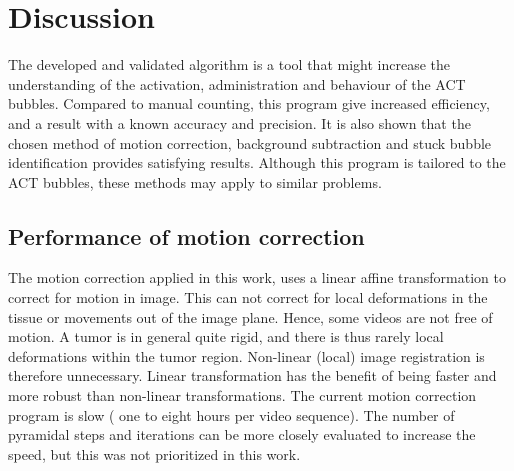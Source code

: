 \section{Discussion}
The developed and validated algorithm is a tool that might increase the understanding of the activation, administration and behaviour of the ACT\texttrademark{} bubbles. Compared to manual counting, this program give increased efficiency, and a result with a known accuracy and precision. It is also shown that the chosen method of motion correction, background subtraction and stuck bubble identification provides satisfying results. Although this program is tailored to the ACT\texttrademark{} bubbles, these methods may apply to similar problems.
\subsection{Performance of motion correction}
The motion correction applied in this work, uses a linear affine transformation to correct for motion in image. This can not correct for local deformations in the tissue or movements out of the image plane. Hence, some videos are not free of motion. A tumor is in general quite rigid, and there is thus rarely local deformations within the tumor region. Non-linear (local) image registration is therefore unnecessary. Linear transformation has the benefit of being faster and more robust than non-linear transformations. The current motion correction program is slow ( one to eight hours per video sequence).  The number of pyramidal steps and iterations can be more closely evaluated to increase the speed, but this was not prioritized in this work. 

